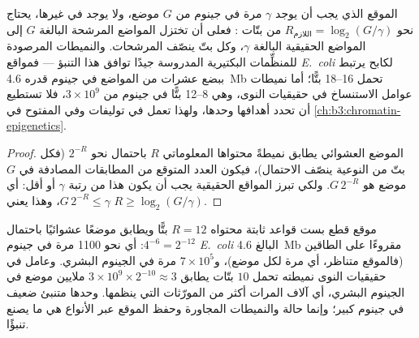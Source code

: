 \begin{proposition}\label{prop:b3:bioinformatics:bits}
الموقع الذي يجب أن يوجد $\gamma$ مرة في جينوم من $G$ موضع،
ولا يوجد في غيرها، يحتاج نحو $R_{\text{اللازم}} = \log_{2}(G/\gamma)$
من بتّات : فعلى  أن تختزل المواضع المرشحة
البالغة $G$ إلى المواضع الحقيقية البالغة $\gamma$، وكل بتّ ينصّف
المرشحات. والنميطات المرصودة للمنظِّمات البكتيرية المدروسة جيدًا توافق
هذا التنبؤ --- فمواقع \emph{E.~coli} لكابح يرتبط ببضع
عشرات من المواضع في جينوم قدره \qty{4.6}{Mb} تحمل \numrange{16}{18} بتًّا؛
أما نميطات عوامل الاستنساخ في حقيقيات النوى، وهي \numrange{8}{12} بتًّا في
جينوم من $3\times 10^{9}$، فلا تستطيع أن تحدد أهدافها وحدها، ولهذا
تعمل في توليفات وفي  المفتوح في
\cref{ch:b3:chromatin-epigenetics}.
\end{proposition}
\begin{proof}
الموضع العشوائي يطابق نميطةً محتواها المعلوماتي $R$
باحتمال نحو $2^{-R}$ (فكل بتّ من النوعية ينصّف الاحتمال)،
فيكون العدد المتوقع من المطابقات المصادفة في $G$ موضع هو $G\,2^{-R}$.
ولكي تبرز المواقع الحقيقية يجب أن يكون هذا من رتبة $\gamma$ أو أقل:
أي $G\,2^{-R} \le \gamma$، وهذا يعني $R \ge \log_{2}(G/\gamma)$.
\end{proof}

\begin{example}\label{ex:b3:bioinformatics:motif-numbers}
موقع قطع بست قواعد ثابتة محتواه $R = 12$ بتًّا ويطابق
موضعًا عشوائيًا باحتمال $4^{-6} = 2^{-12}$: أي نحو \num{1100}
مرة في جينوم \emph{E.~coli} البالغ \qty{4.6}{Mb} مقروءًا على الطاقين
(فالموقع متناظر، أي مرة لكل موضع)، و$7\times 10^{5}$
مرة في الجينوم البشري. وعامل في حقيقيات النوى نميطته تحمل
$10$ بتّات يطابق $3\times 10^{9}\times 2^{-10} \approx 3$ ملايين
موضع في الجينوم البشري، أي آلاف المرات أكثر من
المورّثات التي ينظمها.  وحدها متنبئ ضعيف في جينوم
كبير؛ وإنما حالة  والنميطات المجاورة وحفظ
الموقع عبر الأنواع هي ما يصنع تنبؤًا.
\end{example}

